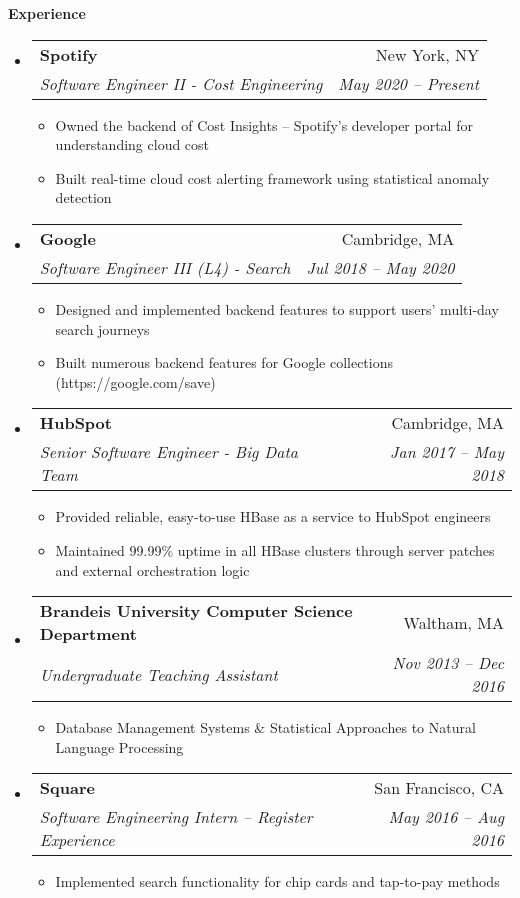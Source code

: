 \documentclass[letterpaper,11pt]{article}
\makeatletter
\newcommand{\resitem}[1]{\item #1 \vspace{-2pt}}
\newcommand{\resheading}[1]{{\large \colorbox{mygrey}{\begin{minipage}{\textwidth}{\textbf{#1 \vphantom{p\^{E}}}}\end{minipage}}}}
\newcommand{\ressubheading}[4]{
\begin{tabular*}{6.5in}{l@{\extracolsep{\fill}}r}
		\textbf{#1} & #2 \\
		\textit{#3} & \textit{#4} \\
\end{tabular*}\vspace{-6pt}}
\makeatother
\begin{document}
\resheading{Experience}
\begin{itemize}
	\item
	      \ressubheading{Spotify}{New York, NY}
	      {Software Engineer II - Cost Engineering}{May 2020 -- Present}
	      {\footnotesize
	      	\begin{itemize}
	      		\resitem{Owned the backend of Cost Insights -- Spotify's developer portal for understanding cloud cost}
	      		\resitem{Built real-time cloud cost alerting framework using statistical anomaly detection}
	      	\end{itemize}
	      }
	\item
	      \ressubheading{Google}{Cambridge, MA}
	      {Software Engineer III (L4) - Search}{Jul 2018 -- May 2020}
	      {\footnotesize
	      	\begin{itemize}
	      		\resitem{Designed and implemented backend features to support users' multi-day search journeys}
	      		\resitem{Built numerous backend features for Google collections (https://google.com/save)}
	      	\end{itemize}
	      }
	\item
	      \ressubheading{HubSpot}{Cambridge, MA}
	      {Senior Software Engineer - Big Data Team}{Jan 2017 -- May 2018}
	      {\footnotesize
	      	\begin{itemize}
	      		\resitem{Provided reliable, easy-to-use HBase as a service to HubSpot engineers}
	      		\resitem{Maintained 99.99\% uptime in all HBase clusters through server patches and external orchestration logic}
	      	\end{itemize}
	      }
	\item
	      \ressubheading{Brandeis University Computer Science Department}{Waltham, MA}
	      {Undergraduate Teaching Assistant}{Nov 2013 -- Dec 2016}
	      {\footnotesize
	      	\begin{itemize}
	      		\resitem{Database Management Systems \& Statistical Approaches to Natural Language Processing}
	      	\end{itemize}
	      }
	      
	\item
	      \ressubheading{Square}{San Francisco, CA}
	      {Software Engineering Intern -- Register Experience}{May 2016 -- Aug 2016}
	      {\footnotesize
	      	\begin{itemize}
	      		\resitem{Implemented search functionality for chip cards and tap-to-pay methods}
	      	\end{itemize}
	      }
	      

\end{itemize}
\end{document}
